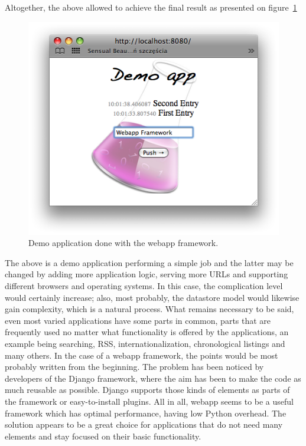 \lstset{caption=Django template system example from the demo application.,label=code:template_sample}

Altogether, the above allowed to achieve the final result as presented on figure~\ref{fig:webapp_sample}
\begin{figure}[ht]
\begin{center}
\includegraphics[scale=0.6]{img/webapp_sample.png}
\caption{Demo application done with the webapp framework.}
\label{fig:webapp_sample}
\end{center}
\end{figure}
The above is a demo application performing a simple job and the latter may be changed by adding more application logic, serving more URLs and supporting different browsers and operating systems. In this case, the complication level would certainly increase; also, most probably, the datastore model would likewise gain complexity, which is a natural process. What remains necessary to be said, even most varied applications have some parts in common, parts that are frequently used no matter what functionality is offered by the applications, an example being searching, RSS, internationalization, chronological listings and many others. In the case of a webapp framework, the points would be most probably written from the beginning. The problem has been noticed by developers of the Django framework, where the aim has been to make the code as much reusable as possible. Django supports those kinds of elements as parts of the framework or easy-to-install plugins. All in all, webapp seems to be a useful framework which has optimal performance, having low Python overhead. The solution appears to be a great choice for applications that do not need many elements  and stay focused on their basic functionality. 

